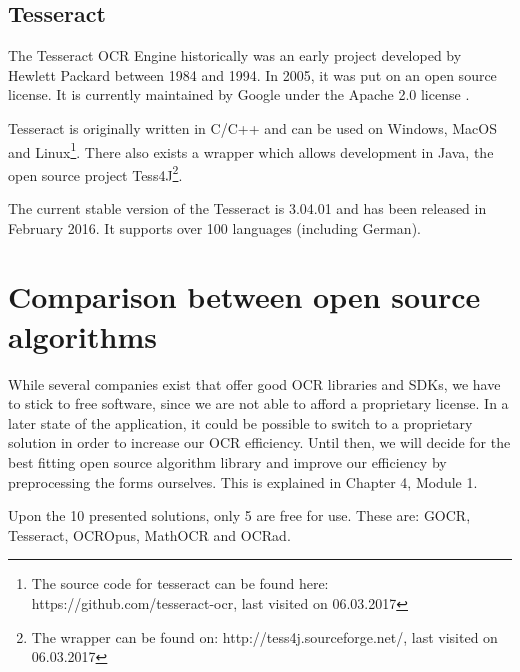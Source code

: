 \label{Tesseract}
\subsection{Tesseract}
The Tesseract OCR Engine historically was an early project developed by Hewlett Packard between 1984 and 1994. In 2005, it was put on an open source license. It is currently maintained by Google under the Apache 2.0 license \cite{smith07}.

Tesseract is originally written in C/C++ and can be used on Windows, MacOS and Linux\footnote{The source code for tesseract can be found here: https://github.com/tesseract-ocr, last visited on 06.03.2017}. There also exists a wrapper which allows development in Java, the open source project Tess4J\footnote{The wrapper can be found on: http://tess4j.sourceforge.net/, last visited on 06.03.2017}.

The current stable version of the Tesseract is 3.04.01 and has been released in February 2016. It supports over 100 languages (including German). 

\label{OCRComparison}
\section{Comparison between open source algorithms}
While several companies exist that offer good OCR libraries and SDKs, we have to stick to free software, since we are not able to afford a proprietary license. In a later state of the application, it could be possible to switch to a proprietary solution in order to increase our OCR efficiency. Until then, we will decide for the best fitting open source algorithm library and improve our efficiency by preprocessing the forms ourselves. This is explained in Chapter 4, Module 1.

Upon the 10 presented solutions, only 5 are free for use. These are: GOCR, Tesseract, OCROpus, MathOCR and OCRad.

